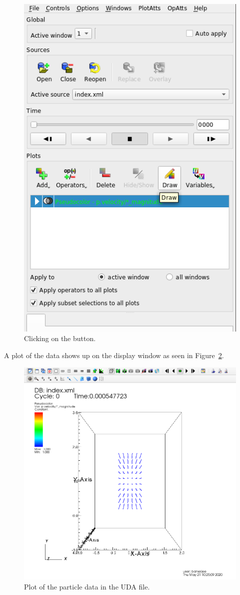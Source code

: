 \begin{paracol}{2}
  \begin{figure}[htb!]
    \centering
    \includegraphics[width=0.9\columnwidth]{FIGS/visit/visit_12.png}
    \caption{Clicking on the  button.}
    \label{fig:visit_12}
  \end{figure}

  \switchcolumn

  A plot of the data shows up on the display window as seen in Figure~\ref{fig:visit_13}.
  \begin{figure}[htb!]
    \centering
    \includegraphics[width=0.4\columnwidth]{FIGS/visit/visit_13.png}
    \caption{Plot of the particle data in the UDA file.}
    \label{fig:visit_13}
  \end{figure}


\end{paracol}

